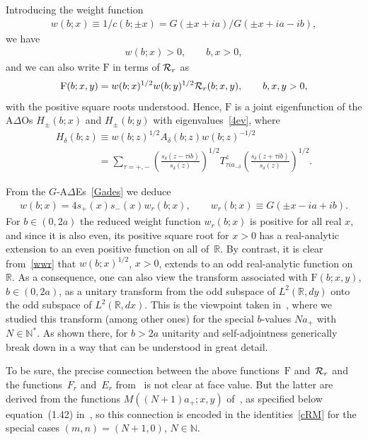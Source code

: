 \documentclass[11pt]{article}
\numberwithin{equation}{section}
\newcommand{\De}{\Delta}
\newcommand{\de}{\delta}
\newcommand{\N}{{\mathbb N}}
\newcommand{\R}{{\mathbb R}}
\newcommand{\cR}{{\cal R}}
\newcommand{\rF}{{\mathrm F}}
\begin{document}
Introducing the weight function
\begin{gather}\label{w}
w(b;x)\equiv 1/c(b;\pm x)=G(\pm x +ia)/G(\pm x +ia-ib),
\end{gather}
we have
\begin{gather}
w(b;x)>0, \qquad b,x>0,
\end{gather}
and we can also write $\rF$ in terms of $\cR_r$ as
\begin{gather}\label{FR}
\rF(b;x,y) =w(b;x)^{1/2}w(b;y)^{1/2}\cR_r(b;x,y),\qquad b,x,y>0,
\end{gather}
with the positive square roots understood.
Hence, $\rF$ is a joint eigenfunction of the A$\De$Os $H_{\pm}(b;x)$ and
$H_{\pm}(b;y)$
with eigenvalues~\eqref{4ev}, where
\begin{gather} 
H_{\de}(b;z)     \equiv    w(b;z)^{1/2} A_{\de}(b;z)w(b;z)^{-1/2}
\nonumber \\
\label{H} \phantom{H_{\de}(b;z)}{}    =
\sum_{\tau=+,-}\left( \frac{s_{\de}(z-\tau ib)}{s_{\de}(z)}\right)^{1/2}T^z_{\tau ia_{-\de}}\left(\frac{s_{\de}(z+\tau ib)}{s_{\de}(z)}\right)^{1/2}.
\end{gather}

From the $G$-A$\De$Es~\eqref{Gades}
we deduce
\begin{gather}\label{wwr}
w(b;x) =4s_{+}(x)s_{-}(x)w_r(b;x), \qquad w_r(b;x)\equiv G(\pm x -ia+ib).
\end{gather}
For $b\in (0,2a)$ the reduced weight function $w_r(b;x)$ is positive for all real $x$, and since it is also even, its positive square root for $x>0$ has a real-analytic extension to an even positive function on all of~$\R$. By contrast, it is clear from~\eqref{wwr} that $w(b;x)^{1/2}$, $x>0$, extends to an odd real-analytic function on~$\R$. As a consequence, one can also view the transform associated with $\rF(b;x,y)$, $b\in (0,2a)$, as a unitary transform from the odd subspace of $L^2(\R,dy)$ onto the odd subspace of $L^2(\R,dx)$. This is the viewpoint taken in~\cite{Hilb}, where we studied this transform (among other ones) for the special $b$-values $Na_{+}$ with $N\in\N^{*}$. As shown there, for $b>2a$ unitarity and self-adjointness generically break down in a way that can be understood in great detail.

To be sure, the precise connection between the above functions~$\rF$ and~$\cR_r$ and the  functions~$F_r$ and~$E_r$ from~\cite{Hilb} is not clear at face value. But the latter are derived from the functions $M((N+1)a_{+};x,y)$ of~\cite{GLFII}, as specif\/ied below equation~(1.42) in~\cite{Hilb}, so this connection is encoded in the identities~\eqref{cRM} for the special cases $(m,n)=(N+1,0)$, $N\in\N$.
\end{document}
